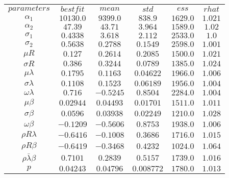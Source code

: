 \begin{tabular}{cccccc}
$parameters$ & $bestfit$ & $mean$ & $std$ & $ess$ & $rhat$\\
$\alpha{_1}$ & $10130.0$ & $9399.0$ & $838.9$ & $1629.0$ & $1.021$\\
$\alpha{_2}$ & $47.39$ & $43.71$ & $3.964$ & $1589.0$ & $1.02$\\
$\sigma{_1}$ & $0.4338$ & $3.618$ & $2.112$ & $2533.0$ & $1.0$\\
$\sigma{_2}$ & $0.5638$ & $0.2788$ & $0.1549$ & $2598.0$ & $1.001$\\
${\mu}R$ & $0.127$ & $0.2614$ & $0.2085$ & $1500.0$ & $1.021$\\
${\sigma}R$ & $0.386$ & $0.3244$ & $0.0789$ & $1385.0$ & $1.024$\\
$\mu\lambda$ & $0.1795$ & $0.1163$ & $0.04622$ & $1966.0$ & $1.006$\\
$\sigma\lambda$ & $0.1108$ & $0.1523$ & $0.06189$ & $1956.0$ & $1.004$\\
$\omega\lambda$ & $0.716$ & $-0.5245$ & $0.8504$ & $2284.0$ & $1.004$\\
$\mu\beta$ & $0.02944$ & $0.04493$ & $0.01701$ & $1511.0$ & $1.011$\\
$\sigma\beta$ & $0.0596$ & $0.03938$ & $0.02249$ & $1210.0$ & $1.028$\\
$\omega\beta$ & $-0.1209$ & $-0.5606$ & $0.8753$ & $1938.0$ & $1.006$\\
${\rho}R\lambda$ & $-0.6416$ & $-0.1008$ & $0.3686$ & $1716.0$ & $1.015$\\
${\rho}R\beta$ & $-0.6419$ & $-0.3468$ & $0.4232$ & $1024.0$ & $1.064$\\
$\rho\bar\lambda\beta$ & $0.7101$ & $0.2839$ & $0.5157$ & $1739.0$ & $1.016$\\
$p$ & $0.04243$ & $0.04796$ & $0.008772$ & $1780.0$ & $1.013$\\
\end{tabular}
